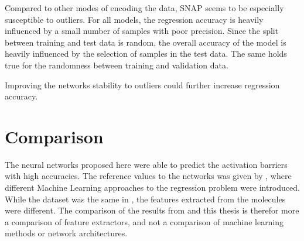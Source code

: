 Compared to other modes of encoding the data, SNAP seems to be especially susceptible to outliers.
For all models, the regression accuracy is heavily influenced by a small number of samples with poor precision.
Since the split between training and test data is random, the overall accuracy of the model is 
heavily influenced by the selection of samples in the test data.
The same holds true for the randomness between training and validation data.

Improving the networks stability to outliers could further increase regression accuracy.


\section{Comparison}
\label{sec:Evaluation:Comparison}

The neural networks proposed here were able to predict the activation barriers with high accuracies.
The reference values to the networks was given by \cite{friederich_dos}, where different Machine Learning 
approaches to the regression problem were introduced.
While the dataset was the same in \cite{friederich_dos}, the features extracted from the molecules were different.
The comparison of the results from  and this thesis is therefor more 
a comparison of feature extractors, and not a comparison of machine learning methods or network architectures.

